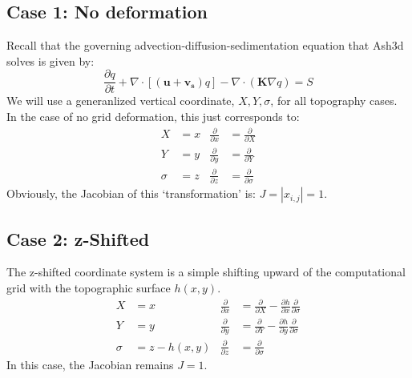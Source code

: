 \subsection{Case 1: No deformation}
Recall that the governing advection-diffusion-sedimentation equation that Ash3d solves is
given by:
\begin{equation}\label{EqGovEqVectApx}
 \frac{\partial q}{\partial t} +
   \nabla \cdot \left[ \left(\mathbf{u} + \mathbf{v_s} \right) q \right]
 - \nabla \cdot \left( \mathbf{K} \nabla q\right) = S
\end{equation}
We will use a generanlized vertical coordinate, $X,Y,\sigma$, for all topography cases.
In the case of no grid deformation, this just corresponds to:
\begin{align*}
X &= x &  \frac{\partial}{\partial x} &= \frac{\partial}{\partial X}\\
Y &= y &  \frac{\partial}{\partial y} &= \frac{\partial}{\partial Y}\\
\sigma &= z &  \frac{\partial}{\partial z} &= \frac{\partial}{\partial \sigma}
\end{align*}
Obviously, the Jacobian of this `transformation' is: $J = |x_{i,j}| = 1$.

\subsection{Case 2: z-Shifted}
The z-shifted coordinate system is a simple shifting upward of the computational
grid with the topographic surface $h(x,y)$.
\begin{align*}
X &= x &  \frac{\partial}{\partial x} &= \frac{\partial}{\partial X}-\frac{\partial h}{\partial x}\frac{\partial}{\partial \sigma}\\
Y &= y &  \frac{\partial}{\partial y} &= \frac{\partial}{\partial Y}-\frac{\partial h}{\partial y}\frac{\partial}{\partial \sigma}\\
\sigma &= z-h(x,y) &  \frac{\partial}{\partial z} &= \frac{\partial}{\partial \sigma}
\end{align*}
In this case, the Jacobian remains $J = 1$.

